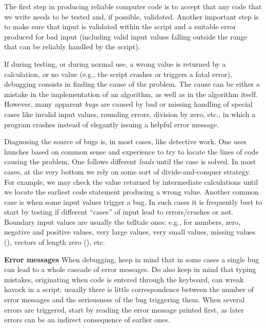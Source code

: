 \documentclass[krantz2]{krantz}\usepackage{knitr}
\begin{document}
The first step in producing reliable computer code is to accept that any code that we write needs to be tested and, if possible, validated. Another important step is to make sure that input is validated within the script and a suitable error produced for bad input (including valid input values falling outside the range that can be reliably handled by the script).

If during testing, or during normal use, a wrong value is returned by a calculation, or no value (e.g.,  the script crashes or triggers a fatal error), debugging consists in finding the cause of the problem. The cause can be either a mistake in the implementation of an algorithm, as well as in the algorithm itself. However, many apparent \emph{bugs} are caused by bad or missing handling of special cases like invalid input values, rounding errors, division by zero, etc., in which a program crashes instead of elegantly issuing a helpful error message.

Diagnosing the source of bugs is, in most cases, like detective work. One uses hunches based on common sense and experience to try to locate the lines of code causing the problem. One follows different \emph{leads} until the case is solved. In most cases, at the very bottom we rely on some sort of divide-and-conquer strategy. For example, we may check the value returned by intermediate calculations until we locate the earliest code statement producing a wrong value. Another common case is when some input values trigger a bug. In such cases it is frequently best to start by testing if different ``cases'' of input lead to errors/crashes or not. Boundary input values are usually the telltale ones: e.g.,  for numbers, zero, negative and positive values, very large values, very small values, missing values (), vectors of length zero (), etc.

\begin{warningbox}
  \textbf{Error messages} When debugging, keep in mind that in some cases a single bug can lead to a whole cascade of error messages. Do also keep in mind that typing mistakes, originating when code is entered through the keyboard, can wreak havock in a script: usually there is little correspondence between the number of error messages and the seriousness of the bug triggering them. When several errors are triggered, start by reading the error message printed first, as later errors can be an indirect consequence of earlier ones.
\end{warningbox}
\end{document}
